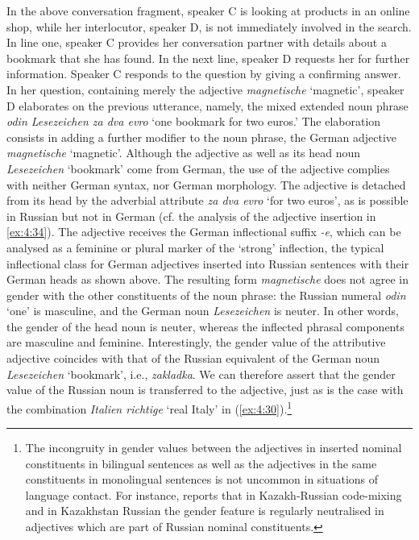 \noindent In the above conversation fragment, speaker C is looking at products in an online shop, while her interlocutor, speaker D, is not immediately involved in the search. In line one, speaker C provides her conversation partner with details about a bookmark that she has found. In the next line, speaker D requests her for further information. Speaker C responds to the question by giving a confirming answer. In her question, containing merely the adjective \textit{magnetische} `magnetic', speaker D elaborates on the previous utterance, namely, the mixed extended noun phrase \textit{odin Lesezeichen za dva evro} `one bookmark for two euros.' The elaboration consists in adding a further modifier to the noun phrase, the German adjective \textit{magnetische} `magnetic'. Although the adjective as well as its head noun \textit{Lesezeichen} `bookmark' come from German, the use of the adjective complies with neither German syntax, nor German morphology. The adjective is detached from its head by the adverbial attribute \textit{za dva evro} `for two euros', as is possible in Russian but not in German (cf. the analysis of the adjective insertion in \ref{ex:4:34}). The adjective receives the German inflectional suffix \textit{-e}, which can be analysed as a feminine or plural marker of the `strong' inflection, the typical inflectional class for German adjectives inserted into Russian sentences with their German heads as shown above. The resulting form \textit{magnetische} does not agree in gender with the other constituents of the noun phrase: the Russian numeral \textit{odin} `one' is masculine, and the German noun \textit{Lesezeichen} is neuter. In other words, the gender of the head noun is neuter, whereas the inflected phrasal components are masculine and feminine. Interestingly, the gender value of the attributive adjective coincides with that of the Russian equivalent of the German noun \textit{Lesezeichen} `bookmark', i.e., \textit{zakladka}. We can therefore assert that the gender value of the Russian noun is transferred to the adjective, just as is the case with the combination \textit{Italien richtige} `real Italy' in (\ref{ex:4:30}).\footnote{The incongruity in gender values between the adjectives in inserted nominal constituents in bilingual sentences as well as the adjectives in the same constituents in monolingual sentences is not uncommon in situations of language contact. For instance, \citet{muhamedowa-untersuchung-2006} reports that in Kazakh-Russian code-mixing and in Kazakhstan Russian the gender feature is regularly neutralised in adjectives which are part of Russian nominal constituents.}

